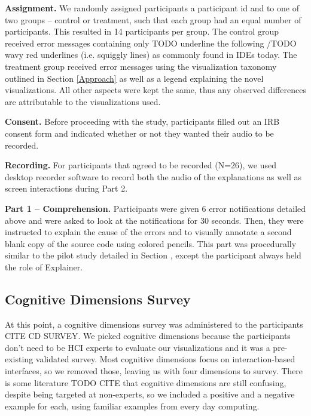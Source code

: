 \documentclass[conference]{IEEEtran}
\begin{document}
\textbf{Assignment.}
We randomly assigned participants a participant id and to one of two groups -- control or treatment, such that each group had an equal number of participants.   This resulted in 14 participants per group. The control group received error messages containing only TODO underline the following /TODO wavy red underlines (i.e. squiggly lines) as commonly found in IDEs today.  The treatment group received error messages using the visualization taxonomy outlined in Section \ref{Approach} as well as a legend explaining the novel visualizations.  All other aspects were kept the same, thus any observed differences are attributable to the visualizations used.

\textbf{Consent.}
Before proceeding with the study, participants filled out an IRB consent form and indicated whether or not they wanted their audio to be recorded.  


\textbf{Recording.} 
For participants that agreed to be recorded (N=26), we used desktop recorder software to record both the audio of the explanations as well as screen interactions during Part 2.

\textbf{Part 1 -- Comprehension.}
Participants were given 6 error notifications detailed above and were asked to look at the notifications for 30 seconds.  Then, they were instructed to explain the cause of the errors and to visually annotate a second blank copy of the source code using colored pencils.  This part was procedurally similar to the pilot study detailed in Section \label{PilotStudy}, except the participant always held the role of Explainer.


\subsection{Cognitive Dimensions Survey}
\label{subsec:cogdim}

At this point, a cognitive dimensions survey was administered to the participants CITE CD SURVEY. We picked cognitive dimensions because the participants don't need to be HCI experts to evaluate our visualizations and it was a pre-existing validated survey.  Most cognitive dimensions focus on interaction-based interfaces, so we removed those, leaving us with four dimensions to survey.  There is some literature TODO CITE that cognitive dimensions are still confusing, despite being targeted at non-experts, so we included a positive and a negative example for each, using familiar examples from every day computing.  
\end{document}
